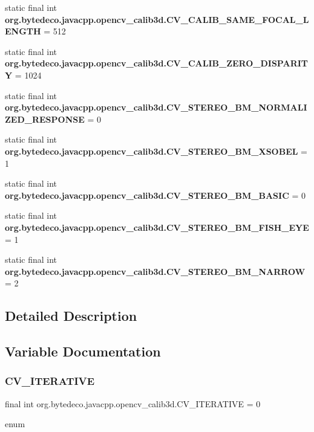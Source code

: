 \begin{DoxyCompactItemize}
static final int {\bfseries org.\+bytedeco.\+javacpp.\+opencv\+\_\+calib3d.\+C\+V\+\_\+\+C\+A\+L\+I\+B\+\_\+\+S\+A\+M\+E\+\_\+\+F\+O\+C\+A\+L\+\_\+\+L\+E\+N\+G\+TH} = 512
\item 
\mbox{\label{group__calib3d__c_ga72c32e80122bb3255e2c5c1bb65c74a2}} 
static final int {\bfseries org.\+bytedeco.\+javacpp.\+opencv\+\_\+calib3d.\+C\+V\+\_\+\+C\+A\+L\+I\+B\+\_\+\+Z\+E\+R\+O\+\_\+\+D\+I\+S\+P\+A\+R\+I\+TY} = 1024
\item 
\mbox{\label{group__calib3d__c_gaf50c40efefd243da87a9297c23464b73}} 
static final int {\bfseries org.\+bytedeco.\+javacpp.\+opencv\+\_\+calib3d.\+C\+V\+\_\+\+S\+T\+E\+R\+E\+O\+\_\+\+B\+M\+\_\+\+N\+O\+R\+M\+A\+L\+I\+Z\+E\+D\+\_\+\+R\+E\+S\+P\+O\+N\+SE} = 0
\item 
\mbox{\label{group__calib3d__c_ga2f2d123f1e248377b57b86fb14108cfb}} 
static final int {\bfseries org.\+bytedeco.\+javacpp.\+opencv\+\_\+calib3d.\+C\+V\+\_\+\+S\+T\+E\+R\+E\+O\+\_\+\+B\+M\+\_\+\+X\+S\+O\+B\+EL} = 1
\item 
\mbox{\label{group__calib3d__c_gad457102e6c2e20d966ced0bfa9f70150}} 
static final int {\bfseries org.\+bytedeco.\+javacpp.\+opencv\+\_\+calib3d.\+C\+V\+\_\+\+S\+T\+E\+R\+E\+O\+\_\+\+B\+M\+\_\+\+B\+A\+S\+IC} = 0
\item 
\mbox{\label{group__calib3d__c_gaf54c5f607b2adc9992952e70b3090e33}} 
static final int {\bfseries org.\+bytedeco.\+javacpp.\+opencv\+\_\+calib3d.\+C\+V\+\_\+\+S\+T\+E\+R\+E\+O\+\_\+\+B\+M\+\_\+\+F\+I\+S\+H\+\_\+\+E\+YE} = 1
\item 
\mbox{\label{group__calib3d__c_ga4ea57027d7c3ae699d1fd6db1403ff6f}} 
static final int {\bfseries org.\+bytedeco.\+javacpp.\+opencv\+\_\+calib3d.\+C\+V\+\_\+\+S\+T\+E\+R\+E\+O\+\_\+\+B\+M\+\_\+\+N\+A\+R\+R\+OW} = 2
\end{DoxyCompactItemize}


\subsection{Detailed Description}


\subsection{Variable Documentation}
\mbox{\label{group__calib3d__c_ga7bd331d354ffd666d56f3fdfc5937e91}} 
\subsubsection{\texorpdfstring{C\+V\+\_\+\+I\+T\+E\+R\+A\+T\+I\+VE}{CV\_ITERATIVE}}
{\footnotesize\ttfamily final int org.\+bytedeco.\+javacpp.\+opencv\+\_\+calib3d.\+C\+V\+\_\+\+I\+T\+E\+R\+A\+T\+I\+VE = 0\hspace{0.3cm}{\ttfamily [static]}}

enum 
